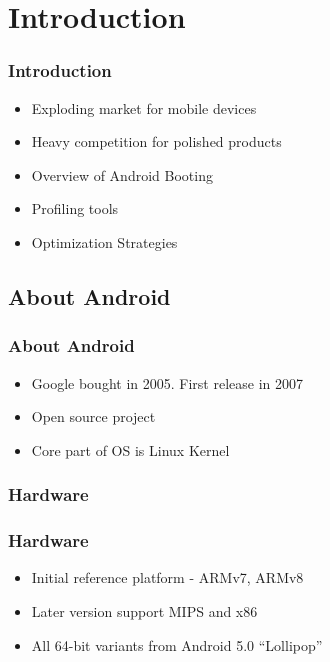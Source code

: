 

\section{Introduction}
\label{report}


\begin{frame}
	\frametitle{Introduction}
	\begin{itemize}
		\item Exploding market for mobile devices \pause
		\item Heavy competition for polished products \pause
		\item Overview of Android Booting \pause
		\item Profiling tools \pause
		\item Optimization Strategies \pause
	\end{itemize}

\end{frame}


\subsection{About Android}

\begin{frame}
	\frametitle{About Android}
	\begin{itemize}
		\item Google bought in 2005. First release in 2007 \pause
		\item Open source project \pause
		\item Core part of OS is Linux Kernel \pause
	\end{itemize}

\end{frame}


\subsubsection {Hardware}


\begin{frame}
	\frametitle{Hardware}
	\begin{itemize}
		\item Initial reference platform - ARMv7, ARMv8 \pause
		\item Later version support MIPS and x86 \pause
		\item All 64-bit variants from Android 5.0 ``Lollipop'' \pause
	\end{itemize}

\end{frame}

